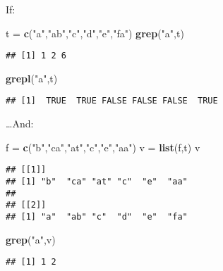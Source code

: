 \documentclass[]{article}
\newenvironment{Shaded}{\begin{snugshade}}{\end{snugshade}}
\newcommand{\KeywordTok}[1]{\textcolor[rgb]{0.13,0.29,0.53}{\textbf{#1}}}
\newcommand{\NormalTok}[1]{#1}
\newcommand{\StringTok}[1]{\textcolor[rgb]{0.31,0.60,0.02}{#1}}
\begin{document}
If:

\begin{Shaded}
\begin{Highlighting}[]
\NormalTok{t =}\StringTok{ }\KeywordTok{c}\NormalTok{(}\StringTok{"a"}\NormalTok{,}\StringTok{"ab"}\NormalTok{,}\StringTok{"c"}\NormalTok{,}\StringTok{"d"}\NormalTok{,}\StringTok{"e"}\NormalTok{,}\StringTok{"fa"}\NormalTok{)}
\KeywordTok{grep}\NormalTok{(}\StringTok{"a"}\NormalTok{,t)}
\end{Highlighting}
\end{Shaded}

\begin{verbatim}
## [1] 1 2 6
\end{verbatim}

\begin{Shaded}
\begin{Highlighting}[]
\KeywordTok{grepl}\NormalTok{(}\StringTok{"a"}\NormalTok{,t)}
\end{Highlighting}
\end{Shaded}

\begin{verbatim}
## [1]  TRUE  TRUE FALSE FALSE FALSE  TRUE
\end{verbatim}

\ldots{}And:

\begin{Shaded}
\begin{Highlighting}[]
\NormalTok{f =}\StringTok{ }\KeywordTok{c}\NormalTok{(}\StringTok{"b"}\NormalTok{,}\StringTok{"ca"}\NormalTok{,}\StringTok{"at"}\NormalTok{,}\StringTok{"c"}\NormalTok{,}\StringTok{"e"}\NormalTok{,}\StringTok{"aa"}\NormalTok{)}
\NormalTok{v =}\StringTok{ }\KeywordTok{list}\NormalTok{(f,t)}
\NormalTok{v}
\end{Highlighting}
\end{Shaded}

\begin{verbatim}
## [[1]]
## [1] "b"  "ca" "at" "c"  "e"  "aa"
## 
## [[2]]
## [1] "a"  "ab" "c"  "d"  "e"  "fa"
\end{verbatim}

\begin{Shaded}
\begin{Highlighting}[]
\KeywordTok{grep}\NormalTok{(}\StringTok{"a"}\NormalTok{,v)}
\end{Highlighting}
\end{Shaded}

\begin{verbatim}
## [1] 1 2
\end{verbatim}
\end{document}
